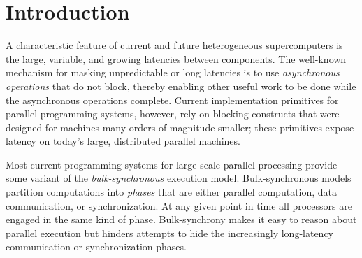 
\section{Introduction}
\label{sec:intro}





A characteristic feature of current and future heterogeneous
supercomputers is the large, variable, and growing latencies between
components.  The well-known mechanism for masking unpredictable or
long latencies is to use {\em asynchronous operations} that do not block,
thereby enabling other useful work to be done while the asynchronous
operations complete. Current implementation primitives for parallel
programming systems, however, rely on blocking constructs that were
designed for machines many orders of magnitude
smaller\cite{MPI,COARRAY_FORTRAN,UPC99}; these primitives expose
latency on today's large, distributed parallel machines.


Most current programming systems for large-scale parallel processing provide some variant
of the {\em bulk-synchronous} execution model\cite{Valiant90}.  Bulk-synchronous models
partition computations into {\em phases} that are either parallel computation, data
communication, or synchronization.  At any given point in time all processors
are engaged in the same kind of phase.  Bulk-synchrony
makes it easy to reason about parallel execution but
hinders attempts to hide the increasingly long-latency communication
or synchronization phases.  

